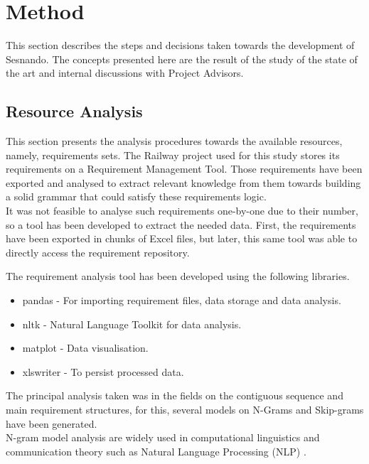 \section{Method}
\label{sec:method}

This section describes the steps and decisions taken towards the development of Sesnando. The concepts presented here are the result of the study of the state of the art and internal discussions with Project Advisors.


\subsection{Resource Analysis}
\label{subsec:resource_analysis}

This section presents the analysis procedures towards the available resources, namely, requirements sets. The Railway project used for this study stores its requirements on a Requirement Management Tool. Those requirements have been exported and analysed to extract relevant knowledge from them towards building a solid grammar that could satisfy these requirements logic.\\

It was not feasible to analyse such requirements one-by-one due to their number, so a tool has been developed to extract the needed data. First, the requirements have been exported in chunks of Excel files, but later, this same tool was able to directly access the requirement repository.

The requirement analysis tool has been developed using the following libraries.

\begin{itemize}
    \item pandas - For importing requirement files, data storage and data analysis.
    \item nltk - Natural Language Toolkit for data analysis.
    \item matplot - Data visualisation.
    \item xlswriter - To persist processed data.
\end{itemize}

The principal analysis taken was in the fields on the contiguous sequence and main requirement structures, for this, several models on N-Grams and Skip-grams have been generated.\\
N-gram model analysis are widely used in computational linguistics and communication theory such as Natural Language Processing (NLP) \cite{broder_syntactic_1997}.\\

